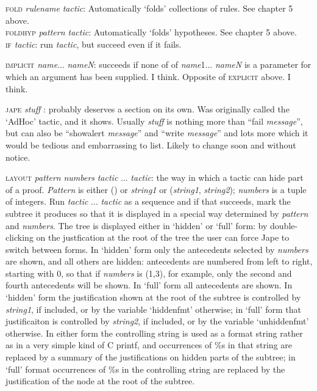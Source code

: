 \documentclass[11pt]{book}
\begin{document}
\textsc{fold} \textit{rulename} \textit{tactic}: Automatically `folds' collections of rules. See chapter 5 above.\\
\textsc{foldhyp} \textit{pattern tactic}: Automatically `folds' hypotheses. See chapter 5 above.\\
\textsc{if} \textit{tactic}: run \textit{tactic}, but succeed even if it fails.


\textsc{implicit} \textit{name}... \textit{nameN}: succeeds if none of of \textit{name}1... \textit{nameN} is a parameter for which an argument has been supplied. I think. Opposite of \textsc{explicit} above. I think.


\textsc{jape} \textit{stuff} : probably deserves a section on its own. Was originally called the `AdHoc' tactic, and it shows. Usually \textit{stuff} is nothing more than ``fail \textit{message}'', but can also be ``showalert \textit{message}'' and ``write \textit{message}'' and lots more which it would be tedious and embarrassing to list. Likely to change soon and without notice.


\textsc{layout} \textit{pattern} \textit{numbers} \textit{tactic} ... \textit{tactic}: the way in which a tactic can hide part of a proof. \textit{Pattern} is either () or \textit{string1} or (\textit{string1}, \textit{string2}); \textit{numbers} is a tuple of integers. Run \textit{tactic} ... \textit{tactic} as a sequence and if that succeeds, mark the subtree it produces so that it is displayed in a special way determined by \textit{pattern} and \textit{numbers}. The tree is displayed either in `hidden' or `full' form: by double-clicking on the justfication at the root of the tree the user can force Jape to switch between forms. In `hidden' form only the antecedents selected by \textit{numbers} are shown, and all others are hidden: antecedents are numbered from left to right, starting with 0, so that if \textit{numbers} is (1,3), for example, only the second and fourth antecedents will be shown. In `full' form all antecedents are shown. In `hidden' form the justification shown at the root of the subtree is controlled by \textit{string1}, if included, or by the variable `hiddenfmt' otherwise; in `full' form that justificaiton is controlled by \textit{string2}, if included, or by the variable `unhiddenfmt' otherwise. In either form the controlling string is used as a format string rather as in a very simple kind of C printf, and occurrences of \%s in that string are replaced by a summary of the justifications on hidden parts of the subtree; in `full' format occurrences of \%s in the controlling string are replaced by the justification of the node at the root of the subtree.
\end{document}
